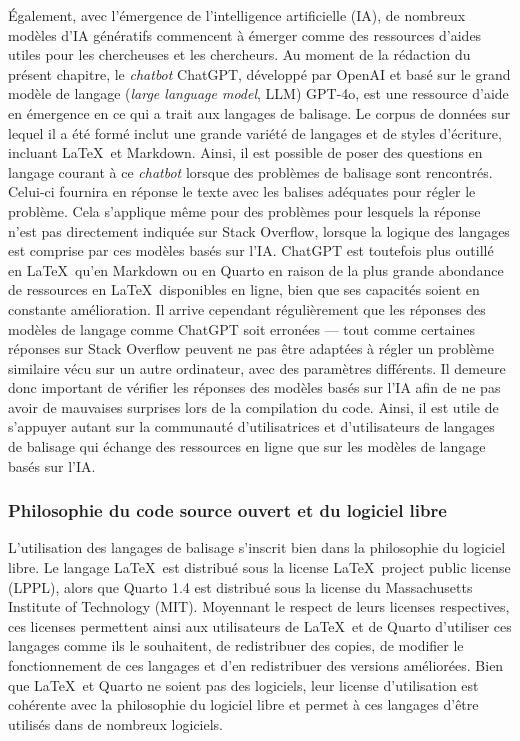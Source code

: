 \documentclass[
  letterpaper,
  DIV=11,
  numbers=noendperiod]{scrreprt}
\begin{document}
Également, avec l'émergence de l'intelligence artificielle (IA), de
nombreux modèles d'IA génératifs commencent à émerger comme des
ressources d'aides utiles pour les chercheuses et les chercheurs. Au
moment de la rédaction du présent chapitre, le \emph{chatbot} ChatGPT,
développé par OpenAI et basé sur le grand modèle de langage (\emph{large
language model}, LLM) GPT-4o, est une ressource d'aide en émergence en
ce qui a trait aux langages de balisage. Le corpus de données sur lequel
il a été formé inclut une grande variété de langages et de styles
d'écriture, incluant \LaTeX~et Markdown. Ainsi, il est possible de poser
des questions en langage courant à ce \emph{chatbot} lorsque des
problèmes de balisage sont rencontrés. Celui-ci fournira en réponse le
texte avec les balises adéquates pour régler le problème. Cela
s'applique même pour des problèmes pour lesquels la réponse n'est pas
directement indiquée sur Stack Overflow, lorsque la logique des langages
est comprise par ces modèles basés sur l'IA. ChatGPT est toutefois plus
outillé en \LaTeX~qu'en Markdown ou en Quarto en raison de la plus
grande abondance de ressources en \LaTeX~disponibles en ligne, bien que
ses capacités soient en constante amélioration. Il arrive cependant
régulièrement que les réponses des modèles de langage comme ChatGPT soit
erronées --- tout comme certaines réponses sur Stack Overflow peuvent ne
pas être adaptées à régler un problème similaire vécu sur un autre
ordinateur, avec des paramètres différents. Il demeure donc important de
vérifier les réponses des modèles basés sur l'IA afin de ne pas avoir de
mauvaises surprises lors de la compilation du code. Ainsi, il est utile
de s'appuyer autant sur la communauté d'utilisatrices et d'utilisateurs
de langages de balisage qui échange des ressources en ligne que sur les
modèles de langage basés sur l'IA.

\subsubsection{Philosophie du code source ouvert et du logiciel
libre}\label{philosophie-du-code-source-ouvert-et-du-logiciel-libre}

L'utilisation des langages de balisage s'inscrit bien dans la
philosophie du logiciel libre. Le langage \LaTeX~est distribué sous la
license \LaTeX~project public license (LPPL), alors que Quarto 1.4 est
distribué sous la license du Massachusetts Institute of Technology
(MIT). Moyennant le respect de leurs licenses respectives, ces licenses
permettent ainsi aux utilisateurs de \LaTeX~et de Quarto d'utiliser ces
langages comme ils le souhaitent, de redistribuer des copies, de
modifier le fonctionnement de ces langages et d'en redistribuer des
versions améliorées. Bien que \LaTeX~et Quarto ne soient pas des
logiciels, leur license d'utilisation est cohérente avec la philosophie
du logiciel libre et permet à ces langages d'être utilisés dans de
nombreux logiciels.
\end{document}
